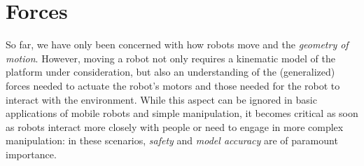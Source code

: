 \chapter{Forces}\label{ch:forces}

So far, we have only been concerned with how robots move and the \textsl{geometry of motion}.
However, moving a robot not only requires a kinematic model of the platform under consideration, but also an understanding of the (generalized) forces needed to actuate the robot's motors and those needed for the robot to interact with the environment.
While this aspect can be ignored in basic applications of mobile robots and simple manipulation, it becomes critical as soon as robots interact more closely with people or need to engage in more complex manipulation: in these scenarios, \textsl{safety} and \textsl{model accuracy} are of paramount importance.

